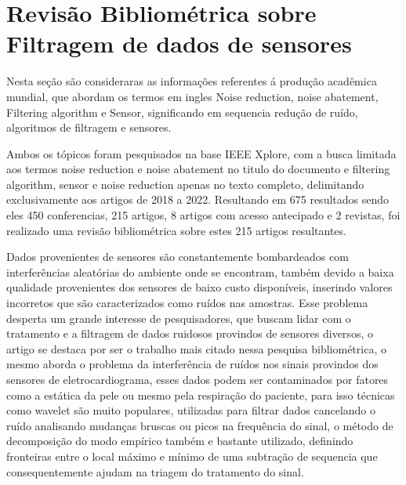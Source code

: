 \chapter{Revisão Bibliométrica sobre Filtragem de dados de sensores}\label{referencial_teorico}

Nesta seção são consideraras as informações referentes á produção acadêmica mundial, que abordam os termos em ingles Noise reduction, noise abatement, Filtering algorithm e Sensor, significando em sequencia redução de ruído, algoritmos de filtragem e sensores. 

Ambos os tópicos foram pesquisados na base IEEE Xplore, com a busca limitada aos termos noise reduction e noise abatement no titulo do documento e filtering algorithm, sensor e noise reduction apenas no texto completo, delimitando exclusivamente aos artigos de 2018 a 2022. Resultando em 675 resultados sendo eles 450 conferencias, 215 artigos, 8 artigos com acesso  antecipado e 2 revistas, foi realizado uma revisão bibliométrica sobre estes 215 artigos resultantes. 

Dados provenientes de sensores são constantemente bombardeados com interferências aleatórias do ambiente onde se encontram, também devido a baixa qualidade provenientes dos sensores de baixo custo disponíveis, inserindo valores incorretos que são caracterizados como ruídos nas amostras. Esse problema desperta um grande interesse de pesquisadores, que buscam lidar com o tratamento e a filtragem de dados ruidosos provindos de sensores diversos, o artigo \cite{chiang_noise_reduction_in_ECG} se destaca por ser o trabalho mais citado nessa pesquisa bibliométrica, o mesmo aborda o problema da interferência de ruídos nos sinais provindos dos sensores de eletrocardiograma, esses dados podem ser contaminados por fatores como a estática da pele ou mesmo pela respiração do paciente, para isso técnicas como wavelet são muito populares, utilizadas para filtrar dados cancelando o ruído analisando mudanças bruscas ou picos na frequência do sinal, o método de decomposição do modo empírico também e bastante utilizado, definindo fronteiras entre o local máximo e mínimo de uma subtração de sequencia que consequentemente ajudam na triagem do tratamento do sinal.   


